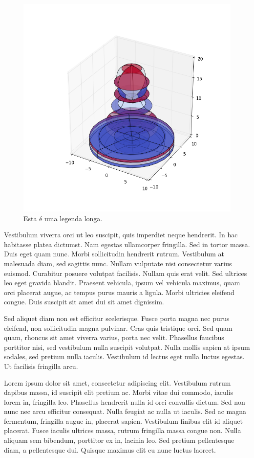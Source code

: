 \documentclass{article}
\begin{document}
	\begin{figure}[H]
		\centering
		\includegraphics[width=0.7\linewidth]{figuras/figure_2}
		\caption[Leganda Curta]{Esta é uma legenda longa.}
		\label{fig:figure_2}
	\end{figure}
	
	Vestibulum viverra orci ut leo suscipit, quis imperdiet neque hendrerit. In hac habitasse platea dictumst. Nam egestas ullamcorper fringilla. Sed in tortor massa. Duis eget quam nunc. Morbi sollicitudin hendrerit rutrum. Vestibulum at malesuada diam, sed sagittis nunc. Nullam vulputate nisi consectetur varius euismod. Curabitur posuere volutpat facilisis. Nullam quis erat velit. Sed ultrices leo eget gravida blandit. Praesent vehicula, ipsum vel vehicula maximus, quam orci placerat augue, ac tempus purus mauris a ligula. Morbi ultricies eleifend congue. Duis suscipit sit amet dui sit amet dignissim.
	
	Sed aliquet diam non est efficitur scelerisque. Fusce porta magna nec purus eleifend, non sollicitudin magna pulvinar. Cras quis tristique orci. Sed quam quam, rhoncus sit amet viverra varius, porta nec velit. Phasellus faucibus porttitor nisi, sed vestibulum nulla suscipit volutpat. Nulla mollis sapien at ipsum sodales, sed pretium nulla iaculis. Vestibulum id lectus eget nulla luctus egestas. Ut facilisis fringilla arcu.
	
	Lorem ipsum dolor sit amet, consectetur adipiscing elit. Vestibulum rutrum dapibus massa, id suscipit elit pretium ac. Morbi vitae dui commodo, iaculis lorem in, fringilla leo. Phasellus hendrerit nulla id orci convallis dictum. Sed non nunc nec arcu efficitur consequat. Nulla feugiat ac nulla ut iaculis. Sed ac magna fermentum, fringilla augue in, placerat sapien. Vestibulum finibus elit id aliquet placerat. Fusce iaculis ultrices massa, rutrum fringilla massa congue non. Nulla aliquam sem bibendum, porttitor ex in, lacinia leo. Sed pretium pellentesque diam, a pellentesque dui. Quisque maximus elit eu nunc luctus laoreet.
	
\end{document}
